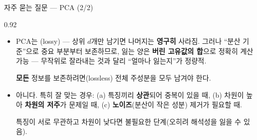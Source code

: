 \begin{frame}{자주 묻는 질문 --- PCA (2/2)}
\begin{center}\begin{varwidth}{0.92\textwidth}
  \small
  \begin{itemize}
    \item {}
      PCA는 (lossy) --- 상위 $d$개만 남기면 나머지는
      \textbf{영구히} 사라짐. 그러나 ``분산 기준''으로 중요 부분부터
      보존하므로, 잃는 양은 \textbf{버린 고유값의 합}으로 정확히 계산
      가능 --- 무작위로 잘라내는 것과 달리 ``얼마나 잃는지''가 정량적.
      \par \textbf{모든} 정보를 보존하려면(lossless) 전체 주성분을
      모두 남겨야 한다.
    \item {}
      아니다. 특히 잘 맞는 경우: (a) 특징끼리 \textbf{상관}되어 중복이
      있을 때, (b) 차원이 높아 \textbf{차원의 저주}가 문제일 때,
      (c) \textbf{노이즈}(분산이 작은 성분) 제거가 필요할 때.
      \par 특징이 서로 무관하고 차원이 낮다면 불필요한 단계(오히려
      해석성을 잃을 수 있음).
  \end{itemize}
\end{varwidth}\end{center}
\end{frame}
